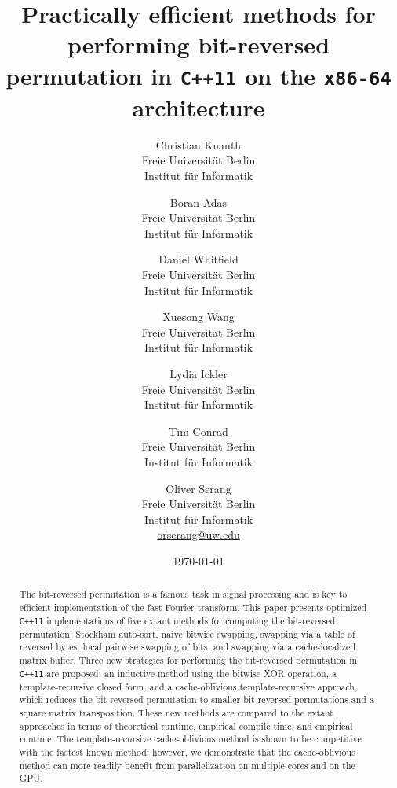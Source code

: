 \documentclass[10pt]{article}
\begin{document}
\title{Practically efficient methods for performing bit-reversed
  permutation in {\tt C++11} on the {\tt x86-64} architecture}

\author{Christian Knauth\\
Freie Universit\"at Berlin\\
Institut f\"{u}r Informatik
\and
Boran Adas\\
Freie Universit\"at Berlin\\
Institut f\"{u}r Informatik
\and
Daniel Whitfield\\
Freie Universit\"at Berlin\\
Institut f\"{u}r Informatik
\and
Xuesong Wang\\
Freie Universit\"at Berlin\\
Institut f\"{u}r Informatik
\and
Lydia Ickler\\
Freie Universit\"at Berlin\\
Institut f\"{u}r Informatik
\and
Tim Conrad\\
Freie Universit\"at Berlin\\
Institut f\"{u}r Informatik
\and
Oliver Serang\\
Freie Universit\"at Berlin\\
Institut f\"{u}r Informatik\\
\url{orserang@uw.edu}
}

\date{{\small \today}}

\maketitle

\begin{abstract}
\noindent The bit-reversed permutation is a famous task in signal
processing and is key to efficient implementation of the fast Fourier
transform. This paper presents optimized {\tt C++11} implementations
of five extant methods for computing the bit-reversed permutation:
Stockham auto-sort, naive bitwise swapping, swapping via a table of
reversed bytes, local pairwise swapping of bits, and swapping via a
cache-localized matrix buffer. Three new strategies for performing the
bit-reversed permutation in {\tt C++11} are proposed: an inductive
method using the bitwise XOR operation, a template-recursive closed
form, and a cache-oblivious template-recursive approach, which reduces
the bit-reversed permutation to smaller bit-reversed permutations and
a square matrix transposition. These new methods are compared to the
extant approaches in terms of theoretical runtime, empirical compile
time, and empirical runtime. The template-recursive cache-oblivious
method is shown to be competitive with the fastest known method;
however, we demonstrate that the cache-oblivious method can more
readily benefit from parallelization on multiple cores and on the GPU.
\end{abstract}
\end{document}
